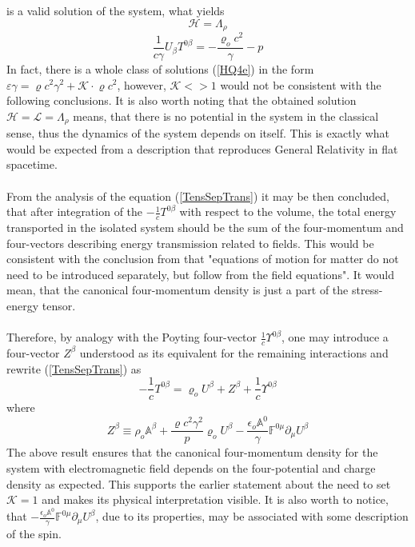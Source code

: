 \documentclass[aps,prx,preprint,groupedaddress,showkeys]{revtex4-2}
\begin{document}
is a valid solution of the system, what yields
\begin{equation} \label{Hvalue}
\mathcal{H} = \Lambda_{\rho}
\end{equation}
\begin{equation} \label{LDR}
\frac{1}{c\gamma} U_{\beta} T^{0 \beta} = - \frac{\varrho_o c^2}{\gamma} - p
\end{equation} 
In fact, there is a whole class of solutions (\ref{HQ4e}) in the form $\varepsilon \gamma = \varrho c^2 \gamma ^2 + \mathcal{K} \cdot \varrho c^2$, however, $\mathcal{K}<>1$ would not be consistent with the following conclusions. It is also worth noting that the obtained solution $\mathcal{H} = \mathcal{L} = \Lambda_{\rho}$ means, that there is no potential in the system in the classical sense, thus the dynamics of the system depends on itself. This is exactly what would be expected from a description that reproduces General Relativity in flat spacetime. \\
~\\
From the analysis of the equation (\ref{TensSepTrans}) it may be then concluded, that after integration of the $-\frac{1}{c}T^{0 \beta}$ with respect to the volume, the total energy transported in the isolated system should be the sum of the four-momentum and four-vectors describing energy transmission related to fields. This would be consistent with the conclusion from \cite{SETH} that "equations of motion for matter do not need to be introduced separately, but follow from the field equations". It would mean, that the canonical four-momentum density is just a part of the stress-energy tensor.\\
~\\
Therefore, by analogy with the Poyting four-vector $\frac{1}{c}\Upsilon^{0 \beta}$, one may introduce a four-vector $Z^{\beta}$ understood as its equivalent for the remaining interactions and rewrite (\ref{TensSepTrans}) as
\begin{equation} \label{HQ4b}
- \frac{1}{c} T^{0 \beta} =  \varrho_o U^{\beta} + Z^{\beta} + \frac{1}{c}\Upsilon^{0 \beta}
\end{equation}
where
\begin{equation} \label{HQ4f}
Z^{\beta} \equiv \rho_o \mathbb{A}^{\beta} + \frac{\varrho c^2 \gamma^2}{p}\varrho_o U^{\beta} - \frac{\epsilon_o \mathbb{A}^0}{\gamma} \mathbb{F}^{0 \mu} \partial_{\mu} U^{\beta}
\end{equation}
The above result ensures that the canonical four-momentum density for the system with electromagnetic field depends on the four-potential and charge density as expected. This supports the earlier statement about the need to set $\mathcal{K}=1$ and makes its physical interpretation visible. It is also worth to notice, that $ -\frac{\epsilon_o \mathbb{A}^0}{\gamma} \mathbb{F}^{0 \mu} \partial_{\mu} U^{\beta}$, due to its properties, may be associated with some description of the spin.\\
\end{document}
